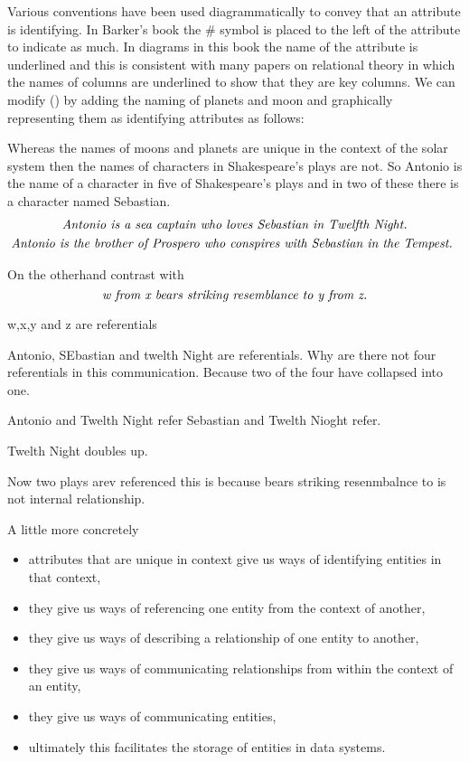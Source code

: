  \mynote
Various conventions have been used diagrammatically to convey that an attribute is identifying. In Barker's book the \# symbol is placed to the left of the attribute to indicate as much. In diagrams in this book the name of the attribute is underlined and this is consistent with many papers on relational theory in which  the names of columns are underlined to show that they are key columns. 
We can modify () by adding the naming of planets and moon and graphically representing them as identifying attributes as follows:







Whereas the names of moons and planets are unique in the context of the solar system then the names of characters in Shakespeare's plays are not.
So Antonio is the name of a character in five of Shakespeare's plays and in two of these there is a character named Sebastian. 
\begin{multline}
\mbox{\textit{Antonio  is a sea captain who loves  Sebastian in Twelfth Night.}} \\
\mbox{\textit{Antonio  is the brother of Prospero who conspires with Sebastian in the Tempest.} }
\end{multline}

On the otherhand contrast with
\begin{equation}
\mbox{\textit{w from x bears striking resemblance to y from z.}}
\end{equation}

w,x,y and z are referentials

Antonio, SEbastian and twelth Night are referentials. Why are there not four referentials in this communication. Because two of the four have collapsed into one. 

Antonio and Twelth Night refer
Sebastian and Twelth Nioght refer.

Twelth Night doubles up.



Now two plays arev referenced this is because bears striking resenmbalnce to is not internal relationship.

\mynote A little more concretely 
\begin{itemize}
\item attributes that are unique in context give us ways of identifying entities in that context, 
\item they give us ways of referencing one entity from the context of another, 
\item they give us ways of describing a relationship of one entity to another,
\item they give us ways of communicating relationships from within the context of an entity,
\item they give us ways of communicating entities, 
\item ultimately this facilitates the storage of entities in data systems. 
\end{itemize}

